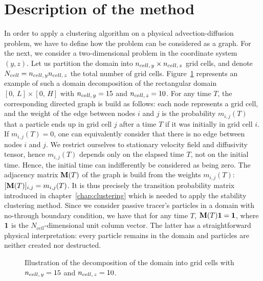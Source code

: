 \section{Description of the method}
In order to apply a clustering algorithm on a physical advection-diffusion problem, we have to define how the problem can be considered as a graph. For the next, we consider a two-dimensional problem in the coordinate system $(y,z)$. Let us partition the domain into $n_{cell,\,y} \times n_{cell,\,z}$ grid cells, and denote $N_{cell} = n_{cell,\,y}n_{cell,\,z}$ the total number of grid cells. Figure~\ref{fig:box_scheme} represents an example of such a domain decomposition of the rectangular domain $[0,\,L]\times[0,\,H]$ with $n_{cell,\,y} = 15$ and $n_{cell,\,z} = 10$. For any time $T$, the corresponding directed graph is build as follows: each node represents a grid cell, and the weight of the edge between nodes $i$ and $j$ is the probability $m_{i,j}(T)$ that a particle ends up in grid cell $j$ after a time $T$ if it was initially in grid cell $i$. If $m_{i,j}(T) = 0$, one can equivalently consider that there is no edge between nodes $i$ and $j$. We restrict ourselves to stationary velocity field and diffusivity tensor, hence $m_{i,j}(T)$ depends only on the elapsed time $T$, not on the initial time. Hence, the initial time can indifferently be considered as being zero. The adjacency matrix $\mathbf M(T)$ of the graph is build from the weights $m_{i,j}(T)$: $[\mathbf M(T)]_{i,j} = m_{i,j}(T)$. It is thus precisely the transition probability matrix introduced in chapter~\ref{chap:clustering} which is needed to apply the stability clustering method. Since we consider passive tracer's particles in a domain with no-through boundary condition, we have that for any time $T$, $\mathbf M(T)\mathbf 1 = \mathbf 1$, where $\mathbf 1$ is the $N_{cell}$-dimensional unit column vector. The latter has a straightforward physical interpretation: every particle remains in the domain and particles are neither created nor destructed.

\begin{figure}[!htp]
	\centering
	
	\caption{Illustration of the decomposition of the domain into grid cells with $n_{cell,\,y} = 15$ and $n_{cell,\,z} = 10$.}
	\label{fig:box_scheme}
\end{figure}

